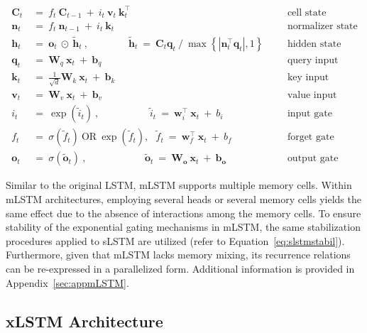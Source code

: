 \begin{align}
\label{eq:mlstm_recurrent_begin}
\mathbf{C}_t \ &= \  f_t \ \mathbf{C}_{t-1} \ + \ 
  i_t \ \mathbf{v}_t \ \mathbf{k}_t^\top & &  &\text{cell state} \\
\mathbf{n}_t \ &= \  f_t \ \mathbf{n}_{t-1} \ + \ 
  i_t \ \mathbf{k}_t & &  &\text{normalizer state} \\
\mathbf{h}_t  \ &= \ \mathbf{o}_t \ \odot \ \tilde{\mathbf{h}}_t
\ , \qquad \qquad 
\tilde{\mathbf{h}}_t \ = \   \mathbf{C}_t \mathbf{q}_t \ / \ 
  \max \left\{ |\mathbf{n}_t^\top \mathbf{q}_t|, 1 \right\} 
   &&&\text{hidden state} \\
\mathbf{q}_t \ &= \ \mathbf{W}_q \ \mathbf{x}_t \ + \ \mathbf{b}_q  & &  &\text{query input} \\
\mathbf{k}_t \ &= \ \frac{1}{\sqrt{d}} \mathbf{W}_k \ \mathbf{x}_t \ + \ \mathbf{b}_k  & &  &\text{key input} \\
\mathbf{v}_t \ &= \ \mathbf{W}_v \ \mathbf{x}_t \ + \ \mathbf{b}_v  & &  &\text{value input} \\
i_t \ &= \ \!\exp \!  \! \left( \tilde{i}_t  \right) \ , 
 \qquad \qquad \ \ \ \ \,
  \tilde{i}_t \ = \ \mathbf{w}^\top_{i} \ \mathbf{x}_t \ + \  b_{i} \ \ \ 
  &&&\text{input gate} \\
f_t \ &= \ \sigma \!  \left(  \tilde{f}_t \right) \ \text{OR} \ \!\exp \!  \! \left(  \tilde{f}_t \right) , \ \ \: \!
\tilde{f}_t \ = \ \mathbf{w}^\top_{f} \ \mathbf{x}_t  \ + \
  b_{f}
  &&& \text{forget gate} \\
\label{eq:mlstm_recurrent_end}
\mathbf{o}_t \ &= \ \sigma \left( \tilde{\mathbf{o}}_t \right) \ , \qquad \qquad \quad \ \ \ \,
  \tilde{\mathbf{o}}_t  \ = \ \mathbf{W}_{\mathbf{o}} \ \mathbf{x}_t \ + \
  \mathbf{b}_{\mathbf{o}}
  &&&\text{output gate} 
\end{align}

Similar to the original LSTM, mLSTM supports multiple memory cells. Within mLSTM architectures, employing several heads or several memory cells yields the same effect due to the absence of interactions among the memory cells. To ensure stability of the exponential gating mechanisms in mLSTM, the same stabilization procedures applied to sLSTM are utilized (refer to Equation~\ref{eq:slstmstabil}). Furthermore, given that mLSTM lacks memory mixing, its recurrence relations can be re-expressed in a parallelized form. Additional information is provided in Appendix~\ref{sec:appmLSTM}.

\subsection{xLSTM Architecture}
\label{sec:xLSTMarch}

